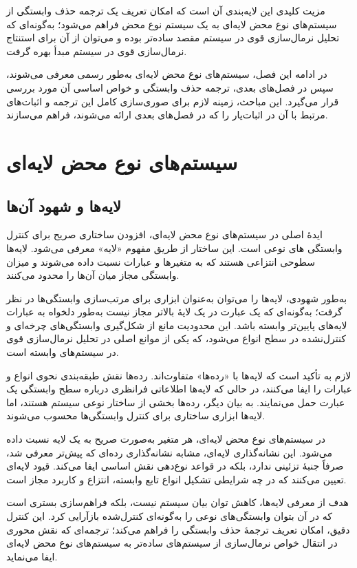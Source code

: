 مزیت کلیدی این لایه‌بندی آن است که امکان تعریف یک ترجمه حذف وابستگی از سیستم‌های نوع محض لایه‌ای به یک سیستم نوع محض فراهم می‌شود؛ به‌گونه‌ای که تحلیل نرمال‌سازی قوی در سیستم مقصد ساده‌تر بوده و می‌توان از آن برای استنتاج نرمال‌سازی قوی در سیستم مبدأ بهره گرفت.

در ادامه این فصل، سیستم‌های نوع محض لایه‌ای به‌طور رسمی معرفی می‌شوند، سپس در فصل‌های بعدی، ترجمه حذف وابستگی و خواص اساسی آن مورد بررسی قرار می‌گیرد. این مباحث، زمینه لازم برای صوری‌سازی کامل این ترجمه و اثبات‌های مرتبط با آن در اثبات‌یار
را که در فصل‌های بعدی ارائه می‌شوند، فراهم می‌سازند.

\section{سیستم‌های نوع محض لایه‌ای}

\subsection*{لایه‌ها و شهود آن‌ها}

ایدهٔ اصلی در سیستم‌های نوع محض لایه‌ای، افزودن ساختاری صریح برای کنترل وابستگی‌ های نوعی است. این ساختار از طریق مفهوم «لایه» معرفی می‌شود. لایه‌ها سطوحی انتزاعی هستند که به متغیرها و عبارات نسبت داده می‌شوند و میزان وابستگی مجاز میان آن‌ها را محدود می‌کنند.

به‌طور شهودی، لایه‌ها را می‌توان به‌عنوان ابزاری برای مرتب‌سازی وابستگی‌ها در نظر گرفت؛ به‌گونه‌ای که یک عبارت در یک لایهٔ بالاتر مجاز نیست به‌طور دلخواه به عبارات لایه‌های پایین‌تر وابسته باشد. این محدودیت مانع از شکل‌گیری وابستگی‌های چرخه‌ای و کنترل‌نشده در سطح انواع می‌شود، که یکی از موانع اصلی در تحلیل نرمال‌سازی قوی در سیستم‌های وابسته است.

لازم به تأکید است که لایه‌ها با «رده‌ها» متفاوت‌اند. رده‌ها نقش طبقه‌بندی نحوی انواع و عبارات را ایفا می‌کنند، در حالی که لایه‌ها اطلاعاتی فرانظری درباره سطح وابستگی یک عبارت حمل می‌نمایند. به بیان دیگر، رده‌ها بخشی از ساختار نوعی سیستم هستند، اما لایه‌ها ابزاری ساختاری برای کنترل وابستگی‌ها محسوب می‌شوند.

در سیستم‌های نوع محض لایه‌ای، هر متغیر به‌صورت صریح به یک لایه نسبت داده می‌شود. این نشانه‌گذاری لایه‌ای، مشابه نشانه‌گذاری رده‌ای که پیش‌تر معرفی شد، صرفاً جنبهٔ تزئینی ندارد، بلکه در قواعد نوع‌دهی نقش اساسی ایفا می‌کند. قیود لایه‌ای تعیین می‌کنند که در چه شرایطی تشکیل انواع تابع وابسته، انتزاع و کاربرد مجاز است.

هدف از معرفی لایه‌ها، کاهش توان بیان سیستم نیست، بلکه فراهم‌سازی بستری است که در آن بتوان وابستگی‌های نوعی را به‌گونه‌ای کنترل‌شده بازآرایی کرد. این کنترل دقیق، امکان تعریف ترجمهٔ حذف وابستگی را فراهم می‌کند؛ ترجمه‌ای که نقش محوری در انتقال خواص نرمال‌سازی از سیستم‌های ساده‌تر به سیستم‌های نوع محض لایه‌ای ایفا می‌نماید.

